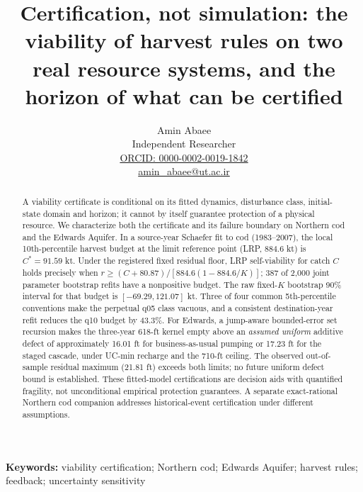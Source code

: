 \documentclass[11pt]{article}
\begin{document}
\title{Certification, not simulation: the viability of harvest rules on two real resource systems, and the horizon of what can be certified}
\author{Amin Abaee\\[0.35em]
{\small Independent Researcher}\\[0.55em]
{\small\href{https://orcid.org/0000-0002-0019-1842}{ORCID: 0000-0002-0019-1842}}\\[0.3em]
{\small\href{mailto:amin\_abaee@ut.ac.ir}{amin\_abaee@ut.ac.ir}}}
\date{}
\maketitle
\begin{abstract}
A viability certificate is conditional on its fitted dynamics, disturbance
class, initial-state domain and horizon; it cannot by itself guarantee
protection of a physical resource. We characterize both the certificate
and its failure boundary on Northern cod and the Edwards Aquifer. In a
source-year Schaefer fit to cod (1983--2007), the local 10th-percentile
harvest budget at the limit reference point (LRP, 884.6 kt) is
$C^*=91.59$ kt. Under the registered fixed residual floor, LRP
self-viability for catch $C$ holds precisely when
$r\ge(C+80.87)/[884.6(1-884.6/K)]$; 387 of 2,000 joint parameter
bootstrap refits have a nonpositive budget. The raw fixed-$K$ bootstrap
90\% interval for that budget is $[-69.29,121.07]$ kt. Three of four
common 5th-percentile conventions make the perpetual q05 class vacuous,
and a consistent destination-year refit reduces the q10 budget by
43.3\%. For Edwards, a jump-aware bounded-error set recursion makes
the three-year 618-ft kernel empty above an \emph{assumed uniform}
additive defect of approximately 16.01 ft for business-as-usual pumping
or 17.23 ft for the staged cascade, under UC-min recharge and the
710-ft ceiling. The observed out-of-sample residual maximum (21.81 ft)
exceeds both limits; no future uniform defect bound is established.
These fitted-model certifications are decision aids with quantified
fragility, not unconditional empirical protection guarantees. A separate
exact-rational Northern cod companion addresses historical-event
certification under different assumptions.
\end{abstract}

\noindent\textbf{Keywords:} viability certification; Northern cod;
Edwards Aquifer; harvest rules; feedback; uncertainty sensitivity


\tableofcontents

\newpage
\end{document}
